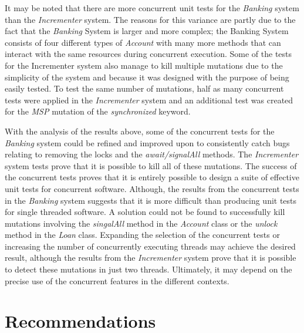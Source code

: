 \documentclass[a4paper,12pt]{article}
\begin{document}
It may be noted that there are more concurrent unit tests for the \textit{Banking} system than the \textit{Incrementer} system. The reasons for this variance are partly due to the fact that the \textit{Banking} System is larger and more complex; the Banking System consists of four different types of \textit{Account} with many more methods that can interact with the same resources during concurrent execution. Some of the tests for the Incrementer system also manage to kill multiple mutations due to the simplicity of the system and because it was designed with the purpose of being easily tested. To test the same number of mutations, half as many concurrent tests were applied in the \textit{Incrementer} system and an additional test was created for the \textit{MSP} mutation of the \textit{synchronized} keyword.   

With the analysis of the results above, some of the concurrent tests for the \textit{Banking} system could be refined and improved upon to consistently catch bugs relating to removing the locks and the \textit{await/signalAll} methods. The \textit{Incrementer} system tests prove that it is possible to kill all of these mutations. The success of the concurrent tests proves that it is entirely possible to design a suite of effective unit tests for concurrent software. Although, the results from the concurrent tests in the \textit{Banking} system suggests that it is more difficult than producing unit tests for single threaded software. A solution could not be found to successfully kill mutations involving the \textit{singalAll} method in the \textit{Account} class or the \textit{unlock} method in the \textit{Loan} class. Expanding the selection of the concurrent tests or increasing the number of concurrently executing threads may achieve the desired result, although the results from the \textit{Incrementer} system prove that it is possible to detect these mutations in just two threads. Ultimately, it may depend on the precise use of the concurrent features in the different contexts. 
    
\newpage	


\section{Recommendations} \label{section:Future Work}
\end{document}
